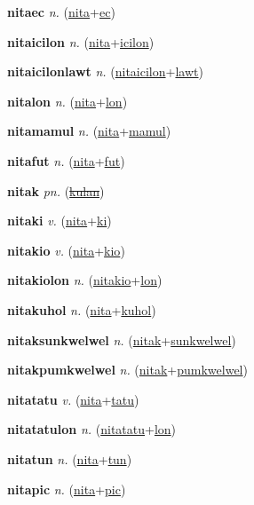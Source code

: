 \textbf{\hypertarget{nitaec}{nitaec}} \textit{n.} (\hyperlink{nita}{nita}+\allowbreak \hyperlink{ec}{ec})


\textbf{\hypertarget{nitaicilon}{nitaicilon}} \textit{n.} (\hyperlink{nita}{nita}+\allowbreak \hyperlink{icilon}{icilon})


\textbf{\hypertarget{nitaicilonlawt}{nitaicilonlawt}} \textit{n.} (\hyperlink{nitaicilon}{nitaicilon}+\allowbreak \hyperlink{lawt}{lawt})


\textbf{\hypertarget{nitalon}{nitalon}} \textit{n.} (\hyperlink{nita}{nita}+\allowbreak \hyperlink{lon}{lon})


\textbf{\hypertarget{nitamamul}{nitamamul}} \textit{n.} (\hyperlink{nita}{nita}+\allowbreak \hyperlink{mamul}{mamul})


\textbf{\hypertarget{nitafut}{nitafut}} \textit{n.} (\hyperlink{nita}{nita}+\allowbreak \hyperlink{fut}{fut})


\textbf{\hypertarget{nitak}{nitak}} \textit{pn.} (\hyperlink{kulan}{\sout{kulan}})


\textbf{\hypertarget{nitaki}{nitaki}} \textit{v.} (\hyperlink{nita}{nita}+\allowbreak \hyperlink{ki}{ki})


\textbf{\hypertarget{nitakio}{nitakio}} \textit{v.} (\hyperlink{nita}{nita}+\allowbreak \hyperlink{kio}{kio})


\textbf{\hypertarget{nitakiolon}{nitakiolon}} \textit{n.} (\hyperlink{nitakio}{nitakio}+\allowbreak \hyperlink{lon}{lon})


\textbf{\hypertarget{nitakuhol}{nitakuhol}} \textit{n.} (\hyperlink{nita}{nita}+\allowbreak \hyperlink{kuhol}{kuhol})


\textbf{\hypertarget{nitaksunkwelwel}{nitaksunkwelwel}} \textit{n.} (\hyperlink{nitak}{nitak}+\allowbreak \hyperlink{sunkwelwel}{sunkwelwel})


\textbf{\hypertarget{nitakpumkwelwel}{nitakpumkwelwel}} \textit{n.} (\hyperlink{nitak}{nitak}+\allowbreak \hyperlink{pumkwelwel}{pumkwelwel})


\textbf{\hypertarget{nitatatu}{nitatatu}} \textit{v.} (\hyperlink{nita}{nita}+\allowbreak \hyperlink{tatu}{tatu})


\textbf{\hypertarget{nitatatulon}{nitatatulon}} \textit{n.} (\hyperlink{nitatatu}{nitatatu}+\allowbreak \hyperlink{lon}{lon})


\textbf{\hypertarget{nitatun}{nitatun}} \textit{n.} (\hyperlink{nita}{nita}+\allowbreak \hyperlink{tun}{tun})


\textbf{\hypertarget{nitapic}{nitapic}} \textit{n.} (\hyperlink{nita}{nita}+\allowbreak \hyperlink{pic}{pic})


